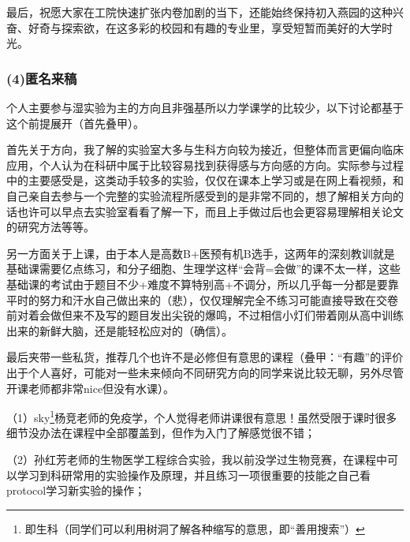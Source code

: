 \documentclass[11pt,oneside]{book}
\begin{document}
最后，祝愿大家在工院快速扩张内卷加剧的当下，还能始终保持初入燕园的这种兴奋、好奇与探索欲，在这多彩的校园和有趣的专业里，享受短暂而美好的大学时光。

\subsubsection{(4)匿名来稿}

个人主要参与湿实验为主的方向且非强基所以力学课学的比较少，以下讨论都基于这个前提展开（首先叠甲）。

\vspace{10pt}

首先关于方向，我了解的实验室大多与生科方向较为接近，但整体而言更偏向临床应用，个人认为在科研中属于比较容易找到获得感与方向感的方向。实际参与过程中的主要感受是，这类动手较多的实验，仅仅在课本上学习或是在网上看视频，和自己亲自去参与一个完整的实验流程所感受到的是非常不同的，想了解相关方向的话也许可以早点去实验室看看了解一下，而且上手做过后也会更容易理解相关论文的研究方法等等。

\vspace{10pt}

另一方面关于上课，由于本人是高数B+医预有机B选手，这两年的深刻教训就是基础课需要亿点练习，和分子细胞、生理学这样“会背=会做”的课不太一样，这些基础课的考试由于题目不少+难度不算特别高+不调分，所以几乎每一分都是要靠平时的努力和汗水自己做出来的（悲），仅仅理解完全不练习可能直接导致在交卷前对着会做但来不及写的题目发出尖锐的爆鸣，不过相信小灯们带着刚从高中训练出来的新鲜大脑，还是能轻松应对的（确信）。

\vspace{10pt}

最后夹带一些私货，推荐几个也许不是必修但有意思的课程（叠甲：“有趣”的评价出于个人喜好，可能对一些未来倾向不同研究方向的同学来说比较无聊，另外尽管开课老师都非常nice但没有水课）。

\vspace{10pt}

（1）sky\footnote{即生科（同学们可以利用树洞了解各种缩写的意思，即“善用搜索”）}杨竞老师的免疫学，个人觉得老师讲课很有意思！虽然受限于课时很多细节没办法在课程中全部覆盖到，但作为入门了解感觉很不错；

\vspace{10pt}

（2）孙红芳老师的生物医学工程综合实验，我以前没学过生物竞赛，在课程中可以学习到科研常用的实验操作及原理，并且练习一项很重要的技能之自己看protocol学习新实验的操作；

\vspace{10pt}
\end{document}
